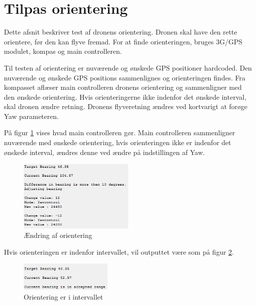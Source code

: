\section{Tilpas orientering}

Dette afsnit beskriver test af dronens orientering. Dronen skal have den rette orientere, før den kan flyve fremad. For at finde orienteringen, bruges 3G/GPS modulet, kompas og main controlleren.

Til testen af orientering er nuværende og ønskede GPS positioner hardcoded. 
Den nuværende og ønskede GPS positions sammenlignes og orienteringen findes. 
Fra kompasset aflæser main controlleren dronens orientering og sammenligner med den ønskede orientering. Hvis orienteringerne ikke indenfor det ønskede interval, skal dronen ændre retning. Dronens flyveretning ændres ved kortvarigt at forøge Yaw parameteren. 


På figur \ref{fig:orientering_skift} vises hvad main controlleren gør. Main controlleren sammenligner nuværende med ønskede orientering, hvis orienteringen ikke er indenfor det ønskede interval, ændres denne ved ændre på indstillingen af Yaw.

\begin{figure}[H]
\centering
\includegraphics[width=0.5\textwidth]{Billeder/Test/bearing_test.png}
\caption{Ændring af orientering}
\label{fig:orientering_skift}
\end{figure}

\vspace{0.5cm}

Hvis orienteringen er indenfor intervallet, vil outputtet være som på figur \ref{fig:orientering_interval}.

\begin{figure}[H]
\centering
\includegraphics[width=0.4\textwidth]{Billeder/Test/bearing_reached.png}
\caption{Orientering er i intervallet}
\label{fig:orientering_interval}
\end{figure}